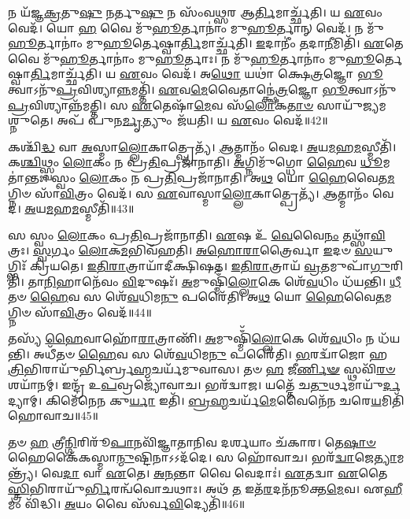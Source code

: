    𑌨 𑌯᳴𑌜𑍍𑌞\-\ul{𑌕𑍍𑌰}\-𑌤𑍁\-\ul{𑌷𑍁} 𑌨𑌰𑍍𑌤𑍁\-\ul{𑌷𑍁} 𑌨 𑌸𑌂᳴𑌵\-\ul{𑌥𑍍𑌸}\-𑌰 𑌆\-\ul{𑌰𑍍𑌤𑌿}\-𑌮𑌾𑌰𑍍𑌚𑍍𑌛᳴𑌤𑌿।
   𑌯 \ul{𑌏}\-𑌵𑌂 𑌵𑍇𑌦᳴।
   𑌯𑍋 \ul{𑌹} 𑌵𑍈 𑌮𑍁᳴\-\ul{𑌹𑍂}\-𑌰𑍍𑌤𑌾𑌨𑌾𑌂॑ 𑌮𑍁\-\ul{𑌹𑍂}\-𑌰𑍍𑌤𑌾𑌨𑍍 𑌵𑍇𑌦᳴।
   𑌨 𑌮𑍁᳴\-\ul{𑌹𑍂}\-𑌰𑍍𑌤𑌾𑌨𑌾𑌂॑ 𑌮𑍁\-\ul{𑌹𑍂}\-𑌰𑍍𑌤𑍇𑌷𑍍𑌵𑌾\-\ul{𑌰𑍍𑌤𑌿}\-𑌮𑌾𑌰𑍍𑌚𑍍𑌛᳴𑌤𑌿।
   \ul{𑌇}\-𑌦𑌾𑌨𑍀𑌂॑ \ul{𑌤}\-𑌦𑌾\-\ul{𑌨𑍀}\-𑌮𑌿𑌤𑌿᳴।
   \ul{𑌏}\-𑌤𑍇 𑌵𑍈 𑌮𑍁᳴\-\ul{𑌹𑍂}\-𑌰𑍍𑌤𑌾𑌨𑌾𑌂॑ 𑌮𑍁\-\ul{𑌹𑍂}\-𑌰𑍍𑌤𑌾𑌃।
   𑌨 𑌮𑍁᳴\-\ul{𑌹𑍂}\-𑌰𑍍𑌤𑌾𑌨𑌾𑌂॑ 𑌮𑍁\-\ul{𑌹𑍂}\-𑌰𑍍𑌤𑍇𑌷𑍍𑌵𑌾\-\ul{𑌰𑍍𑌤𑌿}\-𑌮𑌾𑌰𑍍𑌚𑍍𑌛᳴𑌤𑌿।
   𑌯 \ul{𑌏}\-𑌵𑌂 𑌵𑍇𑌦᳴।
   𑌅\-\ul{𑌥𑍋} 𑌯𑌥𑌾॑ 𑌕𑍍𑌷𑍇\-\ul{𑌤𑍍𑌰}\-𑌜𑍍𑌞𑍋 \ul{𑌭𑍂}\-𑌤𑍍𑌵𑌾𑌽𑌨𑍁᳴\-\ul{𑌪𑍍𑌰}\-𑌵𑌿𑌶𑍍𑌯𑌾\-\ul{𑌨𑍍𑌨}\-𑌮𑌤𑍍𑌤𑌿᳴।
   \ul{𑌏}\-𑌵\-\ul{𑌮𑍇}\-𑌵𑍈𑌤𑌾𑌨𑍍𑌕𑍍𑌷𑍇॑\-\ul{𑌤𑍍𑌰}\-𑌜𑍍𑌞𑍋 \ul{𑌭𑍂}\-𑌤𑍍𑌵𑌾𑌽𑌨𑍁᳴\-\ul{𑌪𑍍𑌰}\-𑌵𑌿𑌶𑍍𑌯𑌾𑌨𑍍𑌨᳴𑌮𑌤𑍍𑌤𑌿।
   𑌸 \ul{𑌏}\-𑌤𑍇𑌷𑌾᳴\-\ul{𑌮𑍇}\-𑌵 𑌸᳴\-\ul{𑌲𑍋}\-𑌕\-\ul{𑌤𑌾}\-\-\ul{𑍞} 𑌸𑌾𑌯𑍁᳴𑌜𑍍𑌯𑌮𑌶𑍍𑌨𑍁𑌤𑍇।
   𑌅𑌪᳴ 𑌪𑍁𑌨\-\ul{𑌰𑍍𑌮𑍃}\-𑌤𑍍𑌯𑍁𑌂 𑌜᳴𑌯𑌤𑌿।
   𑌯 \ul{𑌏}\-𑌵𑌂 𑌵𑍇𑌦᳴॥42॥
\anuvakamend
				
   𑌕𑌶𑍍𑌚𑌿᳴\-\ul{𑌦𑍍𑌧} 𑌵𑌾 \ul{𑌅}\-𑌸𑍍𑌮𑌾\-\ul{𑌲𑍍𑌲𑍋}\-𑌕𑌾𑌤𑍍𑌪𑍍𑌰𑍇𑌤𑍍𑌯᳴।
   \ul{𑌆}\-𑌤𑍍𑌮𑌾𑌨𑌂᳴ 𑌵𑍇𑌦।
   \ul{𑌅}\-𑌯\-\ul{𑌮}\-𑌹\-\ul{𑌮}\-\-𑌸𑍍𑌮𑍀𑌤𑌿᳴।
   𑌕\-\ul{𑌶𑍍𑌚𑌿}\-𑌥𑍍𑌸𑍍𑌵𑌂 \ul{𑌲𑍋}\-𑌕𑌂 𑌨 𑌪𑍍𑌰\-\ul{𑌤𑌿}\-𑌪𑍍𑌰𑌜𑌾᳴𑌨𑌾𑌤𑌿।
   \ul{𑌅}\-𑌗𑍍𑌨𑌿𑌮𑍁᳴𑌗𑍍𑌧𑍋 \ul{𑌹𑍈}\-𑌵 \ul{𑌧𑍂}\-𑌮𑌤𑌾॑𑌨𑍍𑌤𑌃।
   𑌸𑍍𑌵𑌂 \ul{𑌲𑍋}\-𑌕𑌂 𑌨 𑌪𑍍𑌰\-\ul{𑌤𑌿}\-𑌪𑍍𑌰𑌜𑌾᳴𑌨𑌾𑌤𑌿।
   𑌅\-\ul{𑌥} 𑌯𑍋 \ul{𑌹𑍈}\-𑌵𑍈𑌤\-\ul{𑌮}\-𑌗𑍍𑌨𑌿𑍞 𑌸𑌾᳴\-\ul{𑌵𑌿}\-𑌤𑍍𑌰𑌂 𑌵𑍇𑌦᳴।
   𑌸 \ul{𑌏}\-𑌵𑌾𑌸𑍍𑌮𑌾\-\ul{𑌲𑍍𑌲𑍋}\-𑌕𑌾𑌤𑍍𑌪𑍍𑌰𑍇𑌤𑍍𑌯᳴।
   \ul{𑌆}\-𑌤𑍍𑌮𑌾𑌨𑌂᳴ 𑌵𑍇𑌦।
   \ul{𑌅}\-𑌯\-\ul{𑌮}\-𑌹\-\ul{𑌮}\-𑌸𑍍𑌮𑍀𑌤𑌿᳴॥43॥

   𑌸 𑌸𑍍𑌵𑌂 \ul{𑌲𑍋}\-𑌕𑌂 𑌪𑍍𑌰\-\ul{𑌤𑌿}\-𑌪𑍍𑌰𑌜𑌾᳴𑌨𑌾𑌤𑌿।
   \ul{𑌏}\-𑌷 𑌉᳴ \ul{𑌵𑍇}\-𑌵𑍈\-\ul{𑌨𑌂} 𑌤𑌥𑍍𑌸𑌾᳴\-\ul{𑌵𑌿}\-𑌤𑍍𑌰𑌃।
   \ul{𑌸𑍍𑌵}\-𑌰𑍍𑌗𑌂 \ul{𑌲𑍋}\-𑌕\-\ul{𑌮}\-𑌭𑌿𑌵᳴𑌹𑌤𑌿।
   \ul{𑌅}\-\-\ul{𑌹𑍋}\-\-\ul{𑌰𑌾}\-𑌤𑍍𑌰𑍈𑌰𑍍𑌵𑌾 \ul{𑌇}\-𑌦𑍞 \ul{𑌸}\-𑌯𑍁𑌗𑍍𑌭𑌿𑌃᳴ 𑌕𑍍𑌰𑌿𑌯𑌤𑍇।
   \ul{𑌇}\-\-\ul{𑌤𑌿}\-\-\ul{𑌰𑌾}\-𑌤𑍍𑌰𑌾𑌯𑌾᳴𑌦𑍀𑌕𑍍𑌷𑌿𑌷𑌤।
   \ul{𑌇}\-\-\ul{𑌤𑌿}\-\-\ul{𑌰𑌾}\-𑌤𑍍𑌰𑌾𑌯᳴ \ul{𑌵𑍍𑌰}\-𑌤𑌮𑍁𑌪𑌾᳴\-\ul{𑌗𑍁}\-𑌰𑌿𑌤𑌿᳴।
   𑌤𑌾\-\ul{𑌨𑌿}\-𑌹𑌾𑌨𑍇᳴𑌵𑌂 \ul{𑌵𑌿}\-𑌦𑍁𑌷𑌃᳴।
   \ul{𑌅}\-𑌮𑍁𑌷𑍍𑌮𑌿𑌁᳴\-\ul{𑌲𑍍𑌲𑍋}\-𑌕𑍇 𑌶𑍇᳴\-\ul{𑌵}\-𑌧𑌿𑌂 𑌧᳴𑌯𑌨𑍍𑌤𑌿।
   \ul{𑌧𑍀}\-𑌤𑍞 \ul{𑌹𑍈}\-𑌵 𑌸 𑌶𑍇᳴\-\ul{𑌵}\-𑌧𑌿𑌮\-\ul{𑌨𑍁} 𑌪𑌰𑍈᳴𑌤𑌿।
   𑌅\-\ul{𑌥} 𑌯𑍋 \ul{𑌹𑍈}\-𑌵𑍈\-\ul{𑌤}\-𑌮𑌗𑍍𑌨𑌿𑍞 𑌸𑌾᳴\-\ul{𑌵𑌿}\-𑌤𑍍𑌰𑌂 𑌵𑍇𑌦᳴॥44॥

   𑌤𑌸𑍍𑌯᳴ \ul{𑌹𑍈}\-𑌵𑌾𑌹𑍋᳴\-\ul{𑌰𑌾}\-𑌤𑍍𑌰𑌾𑌣𑌿᳴।
   \ul{𑌅}\-𑌮𑍁𑌷𑍍𑌮𑌿𑌁᳴\-\ul{𑌲𑍍𑌲𑍋}\-𑌕𑍇 𑌶𑍇᳴\-\ul{𑌵}\-𑌧𑌿𑌂 𑌨 𑌧᳴𑌯𑌨𑍍𑌤𑌿।
   𑌅𑌧𑍀᳴𑌤𑍞 \ul{𑌹𑍈}\-𑌵 𑌸 𑌶𑍇᳴\-\ul{𑌵}\-𑌧𑌿𑌮\-\ul{𑌨𑍁} 𑌪𑌰𑍈᳴𑌤𑌿।
   \ul{𑌭}\-𑌰𑌦𑍍𑌵𑌾᳴𑌜𑍋 𑌹 \ul{𑌤𑍍𑌰𑌿}\-𑌭𑌿𑌰𑌾𑌯𑍁᳴𑌰𑍍𑌭𑌿𑌰𑍍𑌬𑍍𑌰\-\ul{𑌹𑍍𑌮}\-\-𑌚𑌰𑍍𑌯᳴𑌮𑍁𑌵𑌾𑌸।
   𑌤𑍞 \ul{𑌹} 𑌜𑍀\-\ul{𑌰𑍍𑌣𑌿}\-\-\ul{𑍟} 𑌸𑍍𑌥𑌵𑌿᳴\-\ul{𑌰}\-\-\ul{𑍞} 𑌶𑌯𑌾᳴𑌨𑌮𑍍।
   𑌇𑌨𑍍𑌦𑍍𑌰᳴ 𑌉\-\ul{𑌪}\-𑌵𑍍𑌰𑌜𑍍𑌯𑍋᳴𑌵𑌾𑌚।
   𑌭𑌰᳴𑌦𑍍𑌵𑌾𑌜।
   𑌯𑌤𑍍𑌤𑍇᳴ 𑌚\-\ul{𑌤𑍁}\-𑌰𑍍𑌥𑌮𑌾𑌯𑍁᳴\-\ul{𑌰𑍍𑌦}\-𑌦𑍍𑌯𑌾𑌮𑍍।
   𑌕𑌿𑌮𑍇᳴𑌨𑍇𑌨 𑌕𑍁\-\ul{𑌰𑍍𑌯𑌾} 𑌇𑌤𑌿᳴।
   \ul{𑌬𑍍𑌰}\-\-\ul{𑌹𑍍𑌮}\-𑌚𑌰𑍍𑌯᳴\-\ul{𑌮𑍇}\-𑌵𑍈𑌨𑍇᳴𑌨 𑌚𑌰𑍇\-\ul{𑌯}\-𑌮𑌿𑌤𑌿᳴ 𑌹𑍋𑌵𑌾𑌚॥45॥

   𑌤𑍞 \ul{𑌹} 𑌤𑍍𑌰𑍀\-\ul{𑌨𑍍𑌗𑌿}\-𑌰𑌿𑌰𑍂᳴\-\ul{𑌪𑌾}\-𑌨𑌵𑌿᳴𑌜𑍍𑌞𑌾𑌤𑌾𑌨𑌿𑌵 𑌦𑌰𑍍\mbox{}\-\ul{𑌶}\-𑌯𑌾𑌂 𑌚᳴𑌕𑌾𑌰।
   𑌤𑍇\-\ul{𑌷𑌾}\-\-\ul{𑍞} 𑌹𑍈𑌕𑍈᳴𑌕𑌸𑍍𑌮𑌾\-\ul{𑌨𑍍𑌮𑍁}\-𑌷𑍍𑌟𑌿𑌨𑌾𑌽𑌽𑌦᳴𑌦𑍇।
   𑌸 𑌹𑍋᳴𑌵𑌾𑌚।
   𑌭𑌰᳴\-\ul{𑌦𑍍𑌵𑌾}\-𑌜𑍇\-\ul{𑌤𑍍𑌯𑌾}\-𑌮𑌨𑍍𑌤𑍍𑌰𑍍𑌯᳴।
   𑌵𑍇\-\ul{𑌦𑌾} 𑌵𑌾 \ul{𑌏}\-𑌤𑍇।
   \ul{𑌅}\-\-\ul{𑌨}\-𑌨𑍍𑌤𑌾 𑌵𑍈 𑌵𑍇𑌦𑌾𑌃॑।
   \ul{𑌏}\-𑌤𑌦𑍍𑌵𑌾 \ul{𑌏}\-𑌤𑍈\-\ul{𑌸𑍍𑌤𑍍𑌰𑌿}\-𑌭𑌿𑌰𑌾𑌯𑍁᳴\-\ul{𑌰𑍍𑌭𑌿}\-𑌰𑌨𑍍𑌵᳴\-𑌵𑍋𑌚𑌥𑌾𑌃।
   𑌅𑌥᳴ \ul{𑌤} 𑌇𑌤᳴\-\ul{𑌰}\-𑌦𑌨᳴𑌨𑍂𑌕𑍍𑌤\-\ul{𑌮𑍇}\-𑌵।
   𑌏\-\ul{𑌹𑍀}\-𑌮𑌂 𑌵𑌿᳴𑌦𑍍𑌧𑌿।
   \ul{𑌅}\-𑌯𑌂 𑌵𑍈 𑌸᳴𑌰𑍍𑌵\-\ul{𑌵𑌿}\-𑌦𑍍𑌯𑍇𑌤𑌿᳴॥46॥

